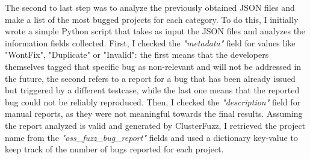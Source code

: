 \newpage
The second to last step was to analyze the previously obtained JSON files and make a list of the most bugged projects for each category.
\newline
To do this, I initially wrote a simple Python script that takes as input the JSON files and analyzes the information fields collected.
\newline
First, I checked the \textit{"metadata"} field for values like "WontFix", "Duplicate" or "Invalid": the first means that the developers themselves tagged that specific bug as non-relevant and will not be addressed in the future, the second refers to a report for a bug that has been already issued but triggered by a different testcase, while the last one means that the reported bug could not be reliably reproduced.
\newline
Then, I checked the \textit{"description"} field for manual reports, as they were not meaningful towards the final results. 
\newline
Assuming the report analyzed is valid and generated by ClusterFuzz, I retrieved the project name from the \textit{"oss\_fuzz\_bug\_report"} fields and used a dictionary key-value to keep track of the number of bugs reported for each project. 
\newline
